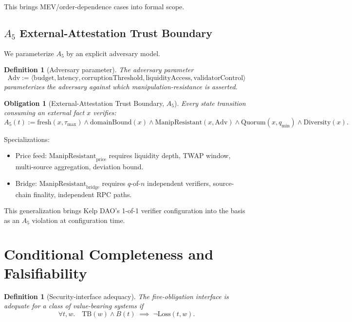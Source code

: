 \documentclass[11pt,a4paper]{article}
\newtheorem{definition}[theorem]{Definition}
\newtheorem{obligation}{Obligation}
\begin{document}
This brings MEV/order-dependence cases into formal scope.

\subsection{$A_5$ External-Attestation Trust Boundary}

We parameterize $A_5$ by an explicit adversary model.

\begin{definition}[Adversary parameter]
The adversary parameter 
\[
\mathrm{Adv} := \langle \mathrm{budget}, \mathrm{latency}, \mathrm{corruptionThreshold}, \mathrm{liquidityAccess}, \mathrm{validatorControl} \rangle
\]
parameterizes the adversary against which manipulation-resistance is asserted.
\end{definition}

\begin{obligation}[External-Attestation Trust Boundary, $A_5$]\label{ob:a5}
Every state transition consuming an external fact $x$ verifies:
\[
A_5(t) := \mathrm{fresh}(x, \tau_{\max}) \wedge \mathrm{domainBound}(x) \wedge \mathrm{ManipResistant}(x, \mathrm{Adv}) \wedge \mathrm{Quorum}(x, q_{\min}) \wedge \mathrm{Diversity}(x).
\]
\end{obligation}

Specializations:
\begin{itemize}
  \item Price feed: $\mathrm{ManipResistant}_{\mathrm{price}}$ requires liquidity depth, TWAP window, multi-source aggregation, deviation bound.
  \item Bridge: $\mathrm{ManipResistant}_{\mathrm{bridge}}$ requires $q$-of-$n$ independent verifiers, source-chain finality, independent RPC paths.
\end{itemize}
This generalization brings Kelp DAO's 1-of-1 verifier configuration into the basis as an $A_5$ violation at configuration time.

\section{Conditional Completeness and Falsifiability}\label{sec:cond-completeness}

\begin{definition}[Security-interface adequacy]\label{def:adequacy}
The five-obligation interface is \emph{adequate} for a class of value-bearing systems if
\[
\forall t, w.\quad \mathrm{TB}(w) \wedge B(t) \;\implies\; \neg \mathrm{Loss}(t, w).
\]
\end{definition}
\end{document}
